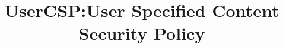 \documentclass[10pt, conference, compsocconf]{IEEEtran}
\title{UserCSP:User Specified Content Security Policy}
\begin{document}
\maketitle










{


}


\end{document}
